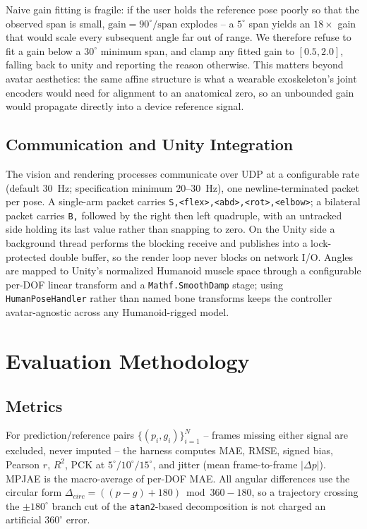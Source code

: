 \documentclass[conference]{IEEEtran}
\begin{document}
Naive gain fitting is fragile: if the user holds the reference pose
poorly so that the observed span is small, $\text{gain} = 90^\circ /
\text{span}$ explodes -- a $5^\circ$ span yields an $18\times$ gain that
would scale every subsequent angle far out of range. We therefore refuse
to fit a gain below a $30^\circ$ minimum span, and clamp any fitted gain
to $[0.5, 2.0]$, falling back to unity and reporting the reason
otherwise. This matters beyond avatar aesthetics: the same affine
structure is what a wearable exoskeleton's joint encoders would need for
alignment to an anatomical zero, so an unbounded gain would propagate
directly into a device reference signal.

\subsection{Communication and Unity Integration}
\label{sec:unity}
The vision and rendering processes communicate over UDP at a configurable
rate (default $30$~Hz; specification minimum $20$--$30$~Hz), one
newline-terminated packet per pose. A single-arm packet carries
\texttt{S,<flex>,<abd>,<rot>,<elbow>}; a bilateral packet carries
\texttt{B,} followed by the right then left quadruple, with an untracked
side holding its last value rather than snapping to zero. On the Unity
side a background thread performs the blocking receive and publishes into
a lock-protected double buffer, so the render loop never blocks on
network I/O. Angles are mapped to Unity's normalized Humanoid muscle
space through a configurable per-DOF linear transform and a
\texttt{Mathf.SmoothDamp} stage; using \texttt{HumanPoseHandler} rather
than named bone transforms keeps the controller avatar-agnostic across
any Humanoid-rigged model.

\section{Evaluation Methodology}
\label{sec:eval-harness}

\subsection{Metrics}
For prediction/reference pairs $\{(p_i, g_i)\}_{i=1}^{N}$ -- frames
missing either signal are excluded, never imputed -- the harness computes
MAE, RMSE, signed bias, Pearson $r$, $R^2$, PCK at
$5^\circ/10^\circ/15^\circ$, and jitter (mean frame-to-frame
$|\Delta p|$). MPJAE is the macro-average of per-DOF MAE. All angular
differences use the circular form
$\Delta_{circ} = ((p-g)+180)\bmod 360 - 180$, so a trajectory crossing
the $\pm180^\circ$ branch cut of the \texttt{atan2}-based decomposition
is not charged an artificial $360^\circ$ error.
\end{document}
